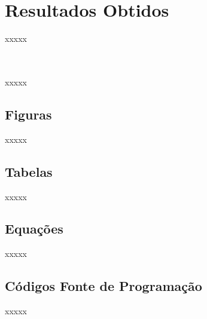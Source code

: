 \chapter{Resultados Obtidos}
\label{Cap:Resultados}
\newcommand{\EscalaAlgumaCoisa}{0.6}


xxxxx

\\\\
xxxxx 

\section{Figuras}

xxxxx


\section{Tabelas}

xxxxx

\section{Equações}

xxxxx

\section{Códigos Fonte de Programação}

xxxxx


